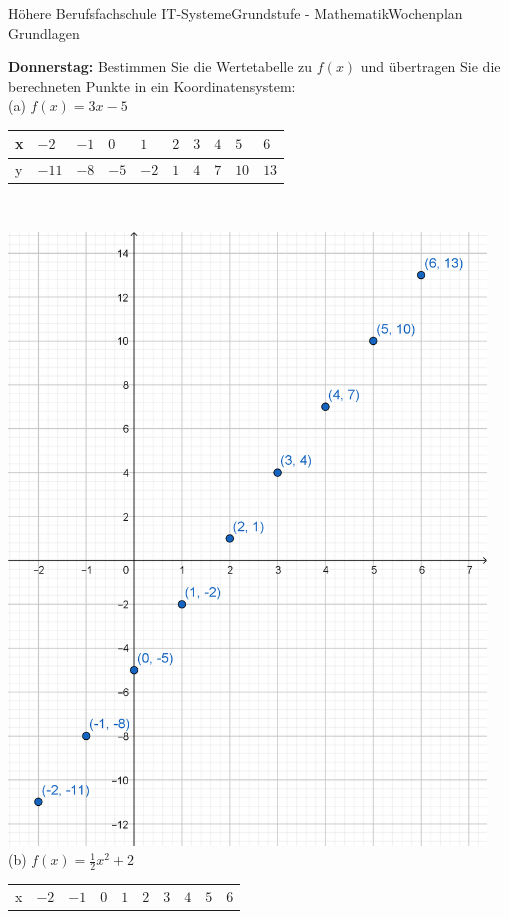 \documentclass[oneside,openany,headings=optiontotoc,11pt,numbers=noenddot]{scrreprt}
\begin{document}
\begin{worksheet}{Höhere Berufsfachschule IT-Systeme}{Grundstufe - Mathematik}{Wochenplan Grundlagen}
		\newpage
		\begin{framed}
			\noindent
			\textbf{Donnerstag:} Bestimmen Sie die Wertetabelle zu \(f(x)\) und übertragen Sie die berechneten Punkte in ein Koordinatensystem:\\
			(a) \(f(x) = 3x-5\)\\
			\begin{tabularx}{\textwidth}{l|M|M|M|M|M|M|M|M|M}
				x & \(-2\) & \(-1\) & \(0\) & \(1\) & \(2\) & \(3\) & \(4\) & \(5\) & \(6\)\\
				\hline
				y & \(-11\) & \(-8\) & \(-5\) & \(-2\) & \(1\) & \(4\) & \(7\) & \(10\) & \(13\)\\ 
			\end{tabularx}\\
			\par\noindent
			\includegraphics[width=0.95\textwidth]{../99_Bilder/WP3Doa.png}\\
			(b) \(f(x) = \frac{1}{2}x^2 + 2 \)\\
			\begin{tabularx}{\textwidth}{l|M|M|M|M|M|M|M|M|M}
				x & \(-2\) & \(-1\) & \(0\) & \(1\) & \(2\) & \(3\) & \(4\) & \(5\) & \(6\)\\

\end{tabularx}
\end{framed}
\end{worksheet}
\end{document}
